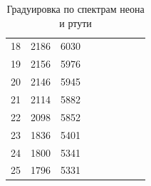 \begin{enumerate}
\begin{table}[h!]
{\begin{tabular}{|rrr|rrrrrr}
					\multicolumn{1}{|r|}{18}    & \multicolumn{1}{r|}{2186}            & 6030                                                 &                      &                      &                       &                            &                                      &                                                      \\ \cline{1-3}
					\multicolumn{1}{|r|}{19}    & \multicolumn{1}{r|}{2156}            & 5976                                                 &                      &                      &                       &                            &                                      &                                                      \\ \cline{1-3}
					\multicolumn{1}{|r|}{20}    & \multicolumn{1}{r|}{2146}            & 5945                                                 &                      &                      &                       &                            &                                      &                                                      \\ \cline{1-3}
					\multicolumn{1}{|r|}{21}    & \multicolumn{1}{r|}{2114}            & 5882                                                 &                      &                      &                       &                            &                                      &                                                      \\ \cline{1-3}
					\multicolumn{1}{|r|}{22}    & \multicolumn{1}{r|}{2098}            & 5852                                                 &                      &                      &                       &                            &                                      &                                                      \\ \cline{1-3}
					\multicolumn{1}{|r|}{23}    & \multicolumn{1}{r|}{1836}            & 5401                                                 &                      &                      &                       &                            &                                      &                                                      \\ \cline{1-3}
					\multicolumn{1}{|r|}{24}    & \multicolumn{1}{r|}{1800}            & 5341                                                 &                      &                      &                       &                            &                                      &                                                      \\ \cline{1-3}
					\multicolumn{1}{|r|}{25}    & \multicolumn{1}{r|}{1796}            & 5331                                                 &                      &                      &                       &                            &                                      &                                                      \\ \cline{1-3}
				\end{tabular}%
			}
		\caption{Градуировка по спектрам неона и ртути}
		\label{HydrogenSpectre_GradsTable}
		\end{table}


\end{enumerate}
